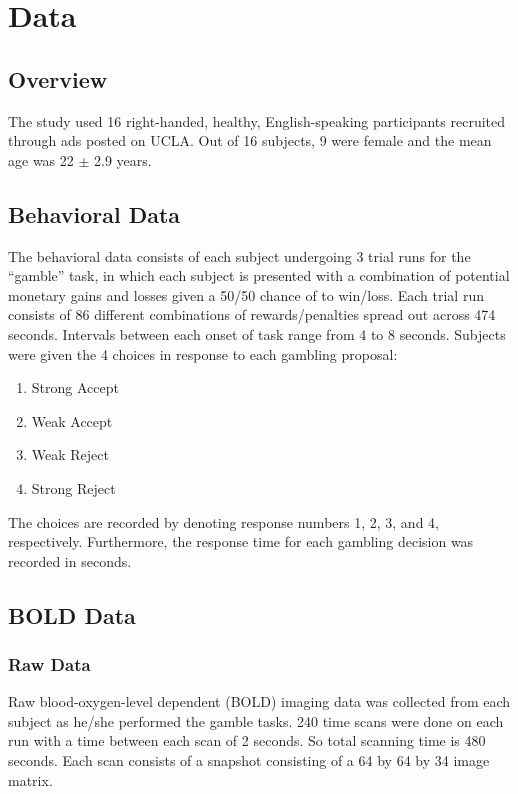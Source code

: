 \documentclass[11pt]{article}
\begin{document}
\section{Data}
\subsection{Overview}
The study used 16 right-handed, healthy, English-speaking participants 
recruited through ads posted on UCLA. Out of 16 subjects, 9 were female and 
the mean age was 22 $ \pm $ 2.9 years.\cite{Tom2007LossAversion} 

\subsection{Behavioral Data}
The behavioral data consists of each subject undergoing 3 trial runs for the 
``gamble'' task, in which each subject is presented with a combination of 
potential monetary gains and losses given a 50/50 chance of to win/loss. Each 
trial run consists of 86 different combinations of rewards/penalties spread 
out across 474 seconds. Intervals between each onset of task range from 4 to 
8 seconds. Subjects were given the 4 choices in response to each gambling 
proposal:
\begin{enumerate}
  \item Strong Accept
  \item Weak Accept
  \item Weak Reject
  \item Strong Reject
\end{enumerate}
The choices are recorded by denoting response numbers 1, 2, 3, and 4, 
respectively. Furthermore, the response time for each gambling decision was 
recorded in seconds. 
\subsection{BOLD Data}
\subsubsection{Raw Data}
Raw blood-oxygen-level dependent (BOLD) imaging data was collected from each
subject as he/she performed the gamble tasks. 240 time scans were done on each
run with a time between each scan of 2 seconds. So total scanning time is 480
seconds. Each scan consists of a snapshot consisting of a 64 by 64 by 34 image
matrix.
\end{document}
